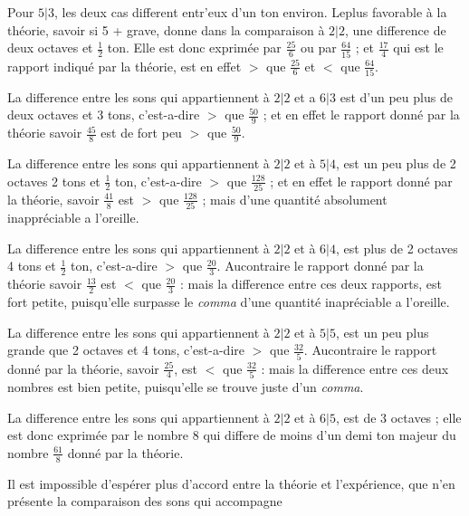 \documentclass[11pt,a4paper]{article}
\begin{document}
Pour $5|3$, les deux cas different entr'eux d'un ton environ. Leplus favorable à
la théorie, savoir si 5 + grave, donne dans la comparaison à $2|2$, une difference
de deux octaves et $\frac{1}{2}$ ton. Elle est donc exprimée par $\frac{25}{6}$ ou par $\frac{64}{15}$ ;
et $\frac{17}{4}$ qui est le rapport indiqué par la théorie, est en effet $>$ que $\frac{25}{6}$
et $<$ que $\frac{64}{15}$.

La difference entre les sons qui appartiennent à $2|2$ et a $6|3$ est d'un
peu plus de deux octaves et 3 tons, c'est-a-dire $>$ que $\frac{50}{9}$ ; et en effet
le rapport donné par la théorie savoir $\frac{45}{8}$ est de fort peu $>$ que $\frac{50}{9}$.

La difference entre les sons qui appartiennent à $2|2$ et à $5|4$, est
un peu plus de 2 octaves 2 tons et $\frac{1}{2}$ ton, c'est-a-dire $>$ que $\frac{128}{25}$ ;
et en effet le rapport donné par la théorie, savoir $\frac{41}{8}$ est $>$ que
$\frac{128}{25}$ ; mais d'une quantité absolument inappréciable a l'oreille.

La difference entre les sons qui appartiennent à $2|2$ et à $6|4$,
est plus de 2 octaves 4 tons et $\frac{1}{2}$ ton, c'est-a-dire $>$ que $\frac{20}{3}$.
Aucontraire le rapport donné par la théorie savoir $\frac{13}{2}$ est $<$ que
$\frac{20}{3}$ : mais la difference entre ces deux rapports, est fort petite,
puisqu'elle surpasse le \emph{comma} d'une quantité inapréciable a l'oreille.

La difference entre les sons qui appartiennent à $2|2$ et à $5|5$, est un
peu plus grande que 2 octaves et 4 tons, c'est-a-dire $>$ que $\frac{32}{5}$.
Aucontraire le rapport donné par la théorie, savoir $\frac{25}{4}$, est $<$ que
$\frac{32}{5}$ : mais la difference entre ces deux nombres est bien petite,
puisqu'elle se trouve juste d'un \emph{comma}.

La difference entre les sons qui appartiennent à $2|2$ et à $6|5$,
est de 3 octaves ; elle est donc exprimée par le nombre 8 qui differe
de moins d'un demi ton majeur du nombre $\frac{61}{8}$ donné par la théorie.

Il est impossible d'espérer plus d'accord entre la théorie et
l'expérience, que n'en présente la comparaison des sons qui accompagne

\end{document}
